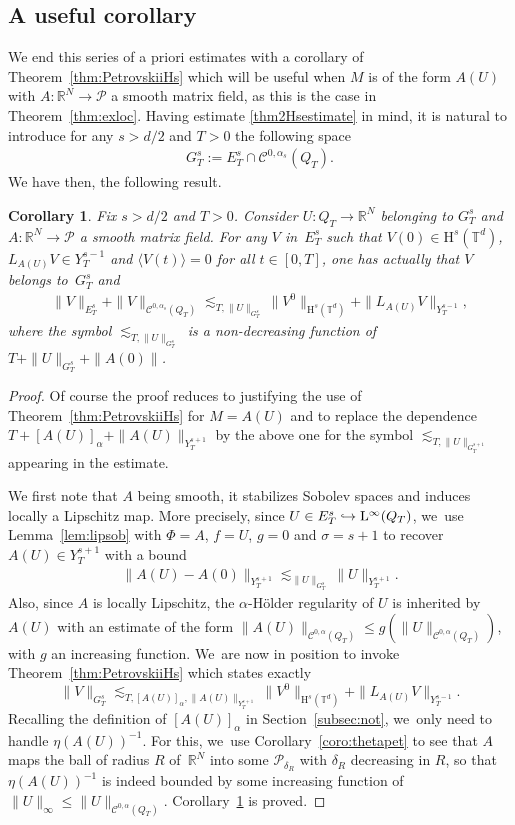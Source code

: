 \documentclass[JEP,XML,SOM,Unicode,published]{cedram}
\newcommand\hto{\mathrel{\lhook\joinrel\to}}
\newtheorem{coro}[prop]{Corollary}
\theoremstyle{definition}
\newcommand\R{\mathbb{R}}
\newcommand\T{\mathbb{T}}
\renewcommand\H{\mathrm{H}}
\renewcommand\L{\mathrm{L}}
\begin{document}
\subsection{A useful corollary}\label{subsec:useful}
We end this series of a priori estimates with a corollary of Theorem~\ref{thm:PetrovskiiHs} which will be useful when $M$ is of the form $A(U)$ with $A:\R^N\to\mathscr{P}$ a smooth matrix field, as this is the case in Theorem~\ref{thm:exloc}. Having estimate \eqref{thm2Hsestimate} in mind, it is natural to introduce for any $s>d/2$ and $T>0$ the following space
\begin{align}\label{def:GTs}
G_T^s:= E_T^s \cap \mathscr{C}^{0,\alpha_s}(Q_T).
\end{align} We have then, the following result.
\begin{coro}\label{coro:useful}
Fix $s>d/2$ and $T>0$. Consider $U:Q_T\to \R^N$ belonging to $G_T^{s}$ and $A:\R^N\to\mathscr{P}$ a smooth matrix field. For any $V$ in~$E_T^s$ such that $V(0)\in\H^s(\T^d)$, $L_{A(U)}V\in Y_T^{s-1}$ and $\langle V(t)\rangle=0$ for all $t\in[0,T]$, one has actually that $V$ belongs to~$G_T^s$ and
\begin{align}\label{thm2Hsestimate:useful}
\|V\|_{E_T^s} + \|V\|_{\mathscr{C}^{0,\alpha_s}(Q_T)} \lesssim_{T,\|U\|_{G_T^s}} \|V^0\|_{\H^s(\T^d)} + \|L_{A(U)}V\|_{Y_T^{s-1}},
\end{align}
where the symbol $\lesssim_{T,\|U\|_{G_T^s}}$ is a non-decreasing function of $T+\|U\|_{G_T^s}+\|A(0)\|$.
\end{coro}
\begin{proof}
Of course the proof reduces to justifying the use of Theorem~\ref{thm:PetrovskiiHs} for $M=A(U)$ and to replace the dependence $T+[A(U)]_\alpha+\|A(U)\|_{Y_T^{s+1}}$ by the above one for the symbol $\lesssim_{T,\|U\|_{G_T^{s+1}}} $ appearing in the estimate.

We first note that $A$ being smooth, it stabilizes Sobolev spaces and induces locally a Lipschitz map. More precisely, since $U\in E_T^s\hto\L^\infty(Q_T)$, we~use Lemma~\ref{lem:lipsob} with $\Phi=A$, $f=U$, $g=0$ and $\sigma=s+1$ to recover $A(U)\in Y_T^{s+1}$ with a bound
\begin{align}\label{ineq:A(U)}
\|A(U)-A(0)\|_{Y_T^{s+1}} \lesssim_{\|U\|_{G_T^s}} \|U\|_{Y_T^{s+1}}.
\end{align}
Also, since $A$ is locally Lipschitz, the $\alpha$-Hölder regularity of $U$ is inherited by $A(U)$ with an estimate of the form $\|A(U)\|_{\mathscr{C}^{0,\alpha}(Q_T)}\leq g(\|U\|_{\mathscr{C}^{0,\alpha}(Q_T)})$, with $g$ an increasing function. We~are now in position to invoke Theorem~\ref{thm:PetrovskiiHs} which states exactly
\[
\| V \|_{G_T^s} \lesssim_{T,[A(U)]_\alpha,\|A(U)\|_{Y_T^{s+1}}} \|V^0\|_{\H^s(\T^d)} + \|L_{A(U)}V\|_{Y_T^{s-1}}.
\]
Recalling the definition of $[A(U)]_\alpha$ in Section~\ref{subsec:not}, we~only need to handle $\eta(A(U))^{-1}$. For this, we~use Corollary~\ref{coro:thetapet} to see that $A$ maps the ball of radius $R$ of~$\R^N$ into some $\mathscr{P}_{\delta_R}$ with $\delta_R$ decreasing in $R$, so that $\eta(A(U))^{-1}$ is indeed bounded by some increasing function of $\|U\|_\infty\leq \|U\|_{\mathscr{C}^{0,\alpha}(Q_T)}$. Corollary~\ref{coro:useful} is proved.
\end{proof}
\end{document}
